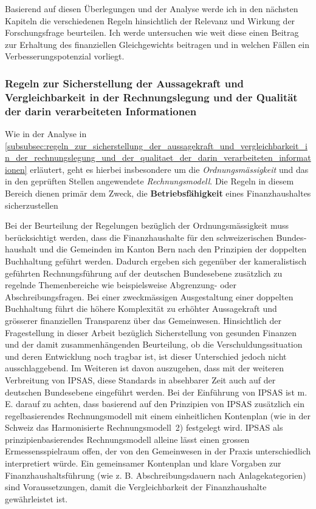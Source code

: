\documentclass[10pt]{article}
\begin{document}
Basierend auf diesen Überlegungen und der Analyse werde ich in den nächsten Kapiteln die verschiedenen Regeln hinsichtlich der Relevanz und Wirkung der Forschungsfrage beurteilen. Ich werde untersuchen wie weit diese einen Beitrag zur Erhaltung des finanziellen Gleichgewichts beitragen und in welchen Fällen ein Verbesserungspotenzial vorliegt.

\subsubsection{Regeln zur Sicherstellung der Aussagekraft und Vergleichbarkeit in der Rechnungslegung und der Qualität der darin verarbeiteten Informationen}\label{subsubsec:regeln_zur_sicherstellung_der_aussagekraft_und_vergleichbarkeit_in_der_rechnungslegung_und_der_qualitaet_der_darin_verarbeiteten_informationen}
Wie in der Analyse in \vref{subsubsec:regeln_zur_sicherstellung_der_aussagekraft_und_vergleichbarkeit_in_der_rechnungslegung_und_der_qualitaet_der_darin_verarbeiteten_informationen} erläutert, geht es hierbei insbesondere um die \textit{Ordnungsmässigkeit} und das in den geprüften Stellen angewendete \textit{Rechnungs­modell}. Die Regeln in diesem Bereich dienen primär dem Zweck, die \textbf{Betriebsfähigkeit} eines Finanzhaushaltes sicherzustellen

Bei der Beurteilung der Regelungen bezüglich der Ordnungsmässigkeit muss berücksichtigt werden, dass die Finanzhaushalte für den schweizerischen Bundes­haushalt und die Gemeinden im Kanton Bern nach den Prinzipien der doppelten Buch­haltung geführt werden. Dadurch ergeben sich gegenüber der kameralistisch geführten Rechnungsführung auf der deutschen Bundesebene zusätzlich zu regelnde Themen­bereiche wie beispielsweise Abgrenzung- oder Abschreibungsfragen. Bei einer zweck­mässigen Ausgestaltung einer doppelten Buchhaltung führt die höhere Komplexität zu erhöhter Aussagekraft und grösserer finanziellen Transparenz über das Gemeinwesen. Hinsichtlich der Fragestellung in dieser Arbeit bezüglich Sicherstellung von gesunden Finanzen und der damit zusammenhängenden Beurteilung, ob die Verschuldungssituation und deren Entwicklung noch tragbar ist, ist dieser Unterschied jedoch nicht ausschlaggebend. Im Weiteren ist davon auszugehen, dass mit der weiteren Verbreitung von IPSAS, diese Standards in absehbarer Zeit auch auf der deutschen Bundesebene eingeführt werden. Bei der Einführung von IPSAS ist m. E. darauf zu achten, dass basierend auf den Prinzipien von IPSAS zusätzlich ein regelbasierendes Rechnungs­modell mit einem einheitlichen Kontenplan (wie in der Schweiz das Harmonisierte Rechnungsmodell~2) festgelegt wird. IPSAS als prinzipienbasierendes Rechnungsmodell alleine lässt einen grossen Ermessensspielraum offen, der von den Gemeinwesen in der Praxis unterschiedlich interpretiert würde. Ein gemeinsamer Kontenplan und klare Vorgaben zur Finanzhaushaltsführung (wie z. B. Abschreibungs­dauern nach Anlage­kategorien) sind Voraussetzungen, damit die Vergleichbarkeit der Finanzhaushalte gewährleistet ist.
\end{document}
